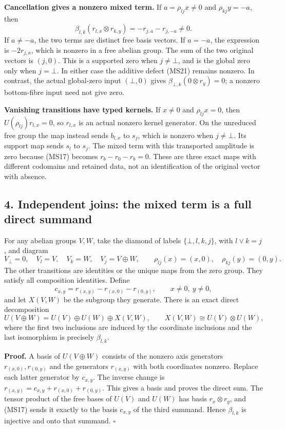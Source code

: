 \documentclass[
]{article}
\begin{document}
\textbf{Cancellation gives a nonzero mixed term.} If
\(a=\rho_{lj}x\ne0\) and \(\rho_{kj}y=-a\), then \[
\beta_{l,k}(r_{l,x}\otimes r_{k,y})=-r_{j,a}-r_{j,-a}\ne0.
\tag{MS21}
\] If \(a\ne-a\), the two terms are distinct free basis vectors. If
\(a=-a\), the expression is \(-2r_{j,a}\), which is nonzero in a free
abelian group. The sum of the two original vectors is \((j,0)\). This is
a supported zero when \(j\ne\bot\), and is the global zero only when
\(j=\bot\). In either case the additive defect (MS21) remains nonzero.
In contrast, the actual global-zero input \((\bot,0)\) gives
\(\beta_{\bot,k}(0\otimes r_y)=0\); a nonzero bottom-fibre input need
not give zero.

\textbf{Vanishing transitions have typed kernels.} If \(x\ne0\) and
\(\rho_{lj}x=0\), then \(U(\rho_{lj})r_{l,x}=0\), so \(r_{l,x}\) is an
actual nonzero kernel generator. On the unreduced free group the map
instead sends \(b_{l,x}\) to \(s_j\), which is nonzero when
\(j\ne\bot\). Its support map sends \(s_l\) to \(s_j\). The mixed term
with this transported amplitude is zero because (MS17) becomes
\(r_b-r_0-r_b=0\). These are three exact maps with different codomains
and retained data, not an identification of the original vector with
absence.

\subsection{4. Independent joins: the mixed term is a full direct
summand}\label{independent-joins-the-mixed-term-is-a-full-direct-summand}

For any abelian groups \(V,W\), take the diamond of labels
\(\{\bot,l,k,j\}\), with \(l\vee k=j\), and diagram \[
V_\bot=0,\quad V_l=V,\quad V_k=W,\quad V_j=V\oplus W,
\qquad \rho_{lj}(x)=(x,0),\quad \rho_{kj}(y)=(0,y).
\tag{MS22}
\] The other transitions are identities or the unique maps from the zero
group. They satisfy all composition identities. Define \[
c_{x,y}=r_{(x,y)}-r_{(x,0)}-r_{(0,y)},
\qquad x\ne0,\ y\ne0,
\tag{MS23}
\] and let \(X(V,W)\) be the subgroup they generate. There is an exact
direct decomposition \[
U(V\oplus W)=U(V)\oplus U(W)\oplus X(V,W),
\qquad X(V,W)\cong U(V)\otimes U(W),
\tag{MS24}
\] where the first two inclusions are induced by the coordinate
inclusions and the last isomorphism is precisely \(\beta_{l,k}\).

\textbf{Proof.} A basis of \(U(V\oplus W)\) consists of the nonzero axis
generators \(r_{(x,0)},r_{(0,y)}\) and the generators \(r_{(x,y)}\) with
both coordinates nonzero. Replace each latter generator by \(c_{x,y}\).
The inverse change is \(r_{(x,y)}=c_{x,y}+r_{(x,0)}+r_{(0,y)}\). This
gives a basis and proves the direct sum. The tensor product of the free
bases of \(U(V)\) and \(U(W)\) has basis \(r_x\otimes r_y\), and (MS17)
sends it exactly to the basis \(c_{x,y}\) of the third summand. Hence
\(\beta_{l,k}\) is injective and onto that summand. \(\square\)
\end{document}
